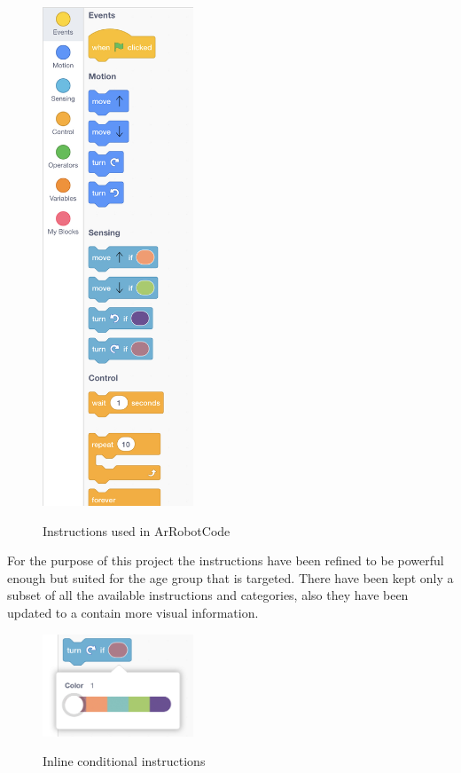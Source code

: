 \documentclass[12 pct]{report}
\begin{document}
\begin{figure}[H]
\includegraphics[width=0.4\textwidth]{allInstructions}
\centering
\label{fig:hololens}
\caption{Instructions used in ArRobotCode}
\end{figure}

For the purpose of this project the instructions have been refined to be powerful enough but suited for the age group that is targeted. There have been kept only a subset of all the available instructions and categories, also they have been updated to a contain more visual information. 

\begin{figure}[H]
\includegraphics[width=0.4\textwidth]{newIf}
\centering
\label{fig:hololens}
\caption{Inline conditional instructions}
\end{figure}
\end{document}
